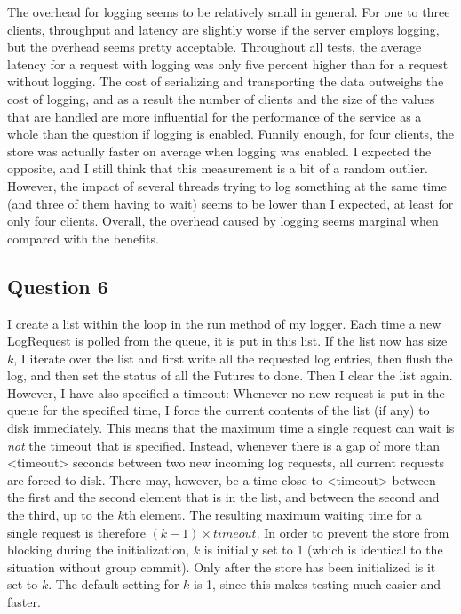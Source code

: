 \documentclass[12pt,a4paper]{article}
\begin{document}
The overhead for logging seems to be relatively small in general. For one to three clients, throughput and latency are slightly worse if the server employs logging, but the overhead seems pretty acceptable. Throughout all tests, the average latency for a request with logging was only five percent higher than for a request without logging. The cost of serializing and transporting the data outweighs the cost of logging, and as a result the number of clients and the size of the values that are handled are more influential for the performance of the service as a whole than the question if logging is enabled. Funnily enough, for four clients, the store was actually faster on average when logging was enabled. I expected the opposite, and I still think that this measurement is a bit of a random outlier. However, the impact of several threads trying to log something at the same time (and three of them having to wait) seems to be lower than I expected, at least for only four clients. Overall, the overhead caused by logging seems marginal when compared with the benefits. 


\subsection*{Question 6}
\label{sec:pq6}
I create a list within the loop in the run method of my logger. Each time a new LogRequest is polled from the queue, it is put in this list. If the list now has size $k$, I iterate over the list and first write all the requested log entries, then flush the log, and then set the status of all the Futures to done. Then I clear the list again. However, I have also specified a timeout: Whenever no new request is put in the queue for the specified time, I force the current contents of the list (if any) to disk immediately. This means that the maximum time a single request can wait is \emph{not} the timeout that is specified. Instead, whenever there is a gap of more than <timeout> seconds between two new incoming log requests, all current requests are forced to disk. There may, however, be a time close to <timeout> between the first and the second element that is in the list, and between the second and the third, up to the $k$th element. The resulting maximum waiting time for a single request is therefore $(k-1)\times timeout$. In order to prevent the store from blocking during the initialization, $k$ is initially set to 1 (which is identical to the situation without group commit). Only after the store has been initialized is it set to $k$. The default setting for $k$ is 1, since this makes testing much easier and faster.
\end{document}

